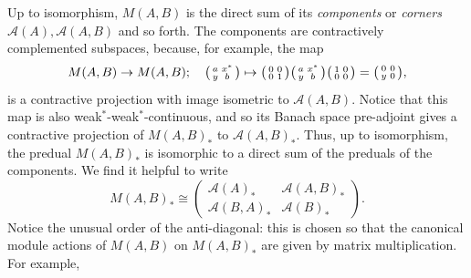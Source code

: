 \documentclass[a4paper,11pt]{article}
\theoremstyle{plain}
\theoremstyle{remark}
\newcommand{\mc}[1]{\mathcal{#1}}
\newenvironment{smat}{\bigl(\begin{smallmatrix}}{\end{smallmatrix}\bigr)}
\begin{document}
Up to isomorphism, $M(A,B)$ is the direct sum of its \emph{components} or \emph{corners} $\mc A(A), \mc A(A,B)$ and so forth.  The components are contractively complemented subspaces, because, for example, the map
\[ M(A,B)\to M(A,B); \quad \begin{smat} a & x^* \\ y & b \end{smat} \mapsto
\begin{smat} 0 & 0 \\ 0 & 1 \end{smat}
\begin{smat} a & x^* \\ y & b \end{smat}
\begin{smat} 1 & 0 \\ 0 & 0 \end{smat}
= \begin{smat} 0 & 0 \\ y & 0 \end{smat}, \]
is a contractive projection with image isometric to $\mc A(A,B)$.  Notice that this map is also weak$^*$-weak$^*$-continuous, and so its Banach space pre-adjoint gives a contractive projection of $M(A,B)_*$ to $\mc A(A,B)_*$.   Thus, up to isomorphism, the predual $M(A,B)_*$ is isomorphic to a direct sum of the preduals of the components.  We find it helpful to write
\[ M(A,B)_* \cong \begin{pmatrix} \mc A(A)_* & \mc A(A,B)_* \\ \mc A(B,A)_* & \mc A(B)_* \end{pmatrix}. \]
Notice the unusual order of the anti-diagonal: this is chosen so that the canonical module actions of $M(A,B)$ on $M(A,B)_*$ are given by matrix multiplication.  For example,
\end{document}
